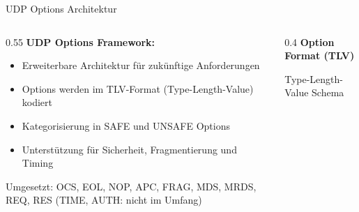 \documentclass[aspectratio=169]{beamer}
\begin{document}
\begin{frame}{UDP Options Architektur}
\begin{columns}[T]
\begin{column}{0.55\textwidth}
\textbf{UDP Options Framework:}

\begin{itemize}
    \item Erweiterbare Architektur für zukünftige Anforderungen
    \item Options werden im TLV-Format (Type-Length-Value) kodiert
    \item Kategorisierung in SAFE und UNSAFE Options
    \item Unterstützung für Sicherheit, Fragmentierung und Timing
\end{itemize}

\vspace{0.5em}
{\small Umgesetzt: OCS, EOL, NOP, APC, FRAG, MDS, MRDS, REQ, RES \quad (TIME, AUTH: nicht im Umfang)}
\end{column}
\begin{column}{0.4\textwidth}
\centering
\textbf{Option Format (TLV)}

\vspace{1em}

\vspace{1.5em}
{\small Type-Length-Value Schema}
\end{column}
\end{columns}
\end{frame}
\end{document}

